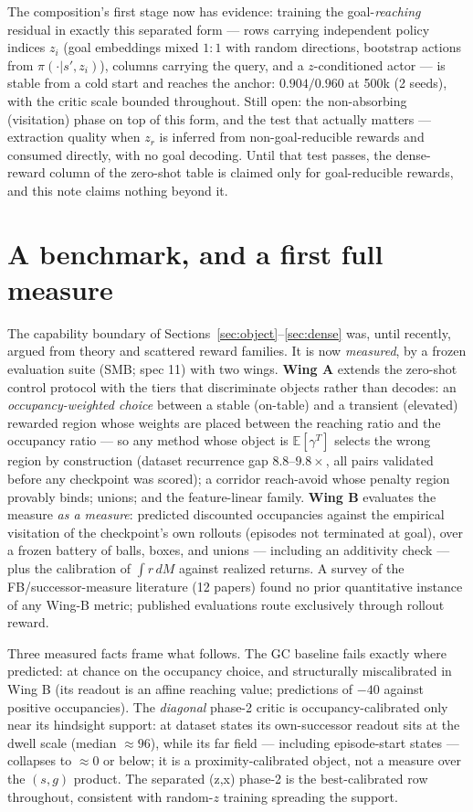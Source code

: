 \documentclass[10pt]{article}
\newcommand{\E}{\mathbb{E}}
\begin{document}
The composition's first stage now has evidence: training the goal-\emph{reaching} residual
in exactly this separated form --- rows carrying independent policy indices $z_i$ (goal
embeddings mixed $1{:}1$ with random directions, bootstrap actions from
$\pi(\cdot|s',z_i)$), columns carrying the query, and a $z$-conditioned actor --- is stable
from a cold start and reaches the anchor: $0.904/0.960$ at 500k (2 seeds), with the critic
scale bounded throughout.
Still open: the non-absorbing (visitation) phase on top of this form, and the test that
actually matters --- extraction quality when $z_r$ is inferred from non-goal-reducible
rewards and consumed directly, with no goal decoding.
Until that test passes, the dense-reward column of the zero-shot table is claimed only for
goal-reducible rewards, and this note claims nothing beyond it.

\section{A benchmark, and a first full measure}
\label{sec:smb}

The capability boundary of Sections~\ref{sec:object}--\ref{sec:dense} was, until
recently, argued from theory and scattered reward families. It is now
\emph{measured}, by a frozen evaluation suite (SMB; spec 11) with two wings.
\textbf{Wing A} extends the zero-shot control protocol with the tiers that
discriminate objects rather than decodes: an \emph{occupancy-weighted choice} between
a stable (on-table) and a transient (elevated) rewarded region whose weights are
placed between the reaching ratio and the occupancy ratio --- so any method whose
object is $\E[\gamma^{T}]$ selects the wrong region by construction (dataset
recurrence gap $8.8$--$9.8\times$, all pairs validated before any checkpoint was
scored); a corridor reach-avoid whose penalty region provably binds; unions; and the
feature-linear family.
\textbf{Wing B} evaluates the measure \emph{as a measure}: predicted discounted
occupancies against the empirical visitation of the checkpoint's own rollouts
(episodes not terminated at goal), over a frozen battery of balls, boxes, and unions
--- including an additivity check --- plus the calibration of $\int r\,dM$ against
realized returns. A survey of the FB/successor-measure literature (12 papers) found
no prior quantitative instance of any Wing-B metric; published evaluations route
exclusively through rollout reward.

Three measured facts frame what follows. The GC baseline fails exactly where
predicted: at chance on the occupancy choice, and structurally miscalibrated in
Wing B (its readout is an affine reaching value; predictions of $-40$ against
positive occupancies). The \emph{diagonal} phase-2 critic is occupancy-calibrated
only near its hindsight support: at dataset states its own-successor readout sits at
the dwell scale (median $\approx 96$), while its far field --- including episode-start
states --- collapses to $\approx 0$ or below; it is a proximity-calibrated object, not
a measure over the $(s,g)$ product. The separated (z,x) phase-2 is the
best-calibrated row throughout, consistent with random-$z$ training spreading the
support.
\end{document}
